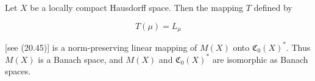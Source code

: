 Let $X$ be a locally compact Hausdorff space. Then the mapping $T$ defined by

$$T(\mu) = L_\mu$$

[see (20.45)] is a norm-preserving linear mapping of $M(X)$ onto $\mathfrak{C}_0(X)^*$. Thus $M(X)$ is a Banach space, and $M(X)$ and $\mathfrak{C}_0(X)^*$ are isomorphic as Banach spaces.
